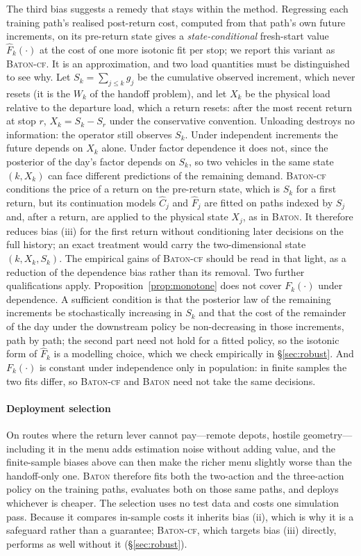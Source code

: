 \documentclass[preprint,authoryear,12pt]{elsarticle}
\theoremstyle{definition}
\theoremstyle{remark}
\begin{document}
The third bias suggests a remedy that stays within the method.
Regressing each training path's realised post-return cost, computed from
that path's own future increments, on its pre-return state gives a
\emph{state-conditional} fresh-start value $\widehat F_k(\cdot)$ at the
cost of one more isotonic fit per stop; we report this variant as
\textsc{Baton-cf}. It is an approximation, and two load quantities must
be distinguished to see why. Let $S_k = \sum_{j \le k} g_j$ be the
cumulative observed increment, which never resets (it is the $W_k$ of
the handoff problem), and let $X_k$ be the physical load relative to the
departure load, which a return resets: after the most recent return at
stop $r$, $X_k = S_k - S_r$ under the conservative convention. Unloading
destroys no information: the operator still observes $S_k$. Under
independent increments the future depends on $X_k$ alone. Under factor
dependence it does not, since the posterior of the day's factor depends
on $S_k$, so two vehicles in the same state $(k, X_k)$ can face different
predictions of the remaining demand. \textsc{Baton-cf} conditions the
price of a return on the pre-return state, which is $S_k$ for a first
return, but its continuation models $\widehat C_j$ and $\widehat F_j$ are
fitted on paths indexed by $S_j$ and, after a return, are applied to the
physical state $X_j$, as in \textsc{Baton}. It therefore reduces bias
(iii) for the first return without conditioning later decisions on the
full history; an exact treatment would carry the two-dimensional state
$(k, X_k, S_k)$. The empirical gains of \textsc{Baton-cf} should be read
in that light, as a reduction of the dependence bias rather than its
removal. Two further qualifications apply. Proposition~\ref{prop:monotone}
does not cover $F_k(\cdot)$ under dependence. A sufficient condition is
that the posterior law of the remaining increments be stochastically
increasing in $S_k$ and that the cost of the remainder of the day under
the downstream policy be non-decreasing in those increments, path by
path; the second part need not hold for a fitted policy, so the isotonic
form of $\widehat F_k$ is a modelling choice, which we check empirically
in \S\ref{sec:robust}. And $F_k(\cdot)$ is constant under independence
only in population: in finite samples the two fits differ, so
\textsc{Baton-cf} and \textsc{Baton} need not take the same decisions.

\paragraph{Deployment selection} On routes where the return lever
cannot pay---remote depots, hostile geometry---including it in the menu
adds estimation noise without adding value, and the finite-sample
biases above can then make the richer menu slightly worse than the
handoff-only one. \textsc{Baton} therefore fits both the two-action and
the three-action policy on the training paths, evaluates both on those
same paths, and deploys whichever is cheaper. The selection uses no test
data and costs one simulation pass. Because it compares in-sample costs
it inherits bias (ii), which is why it is a safeguard rather than a
guarantee; \textsc{Baton-cf}, which targets bias (iii) directly,
performs as well without it (\S\ref{sec:robust}).
\end{document}
